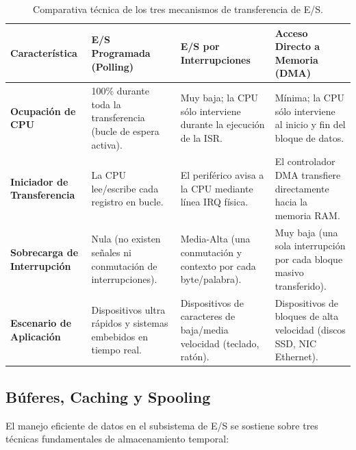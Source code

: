 \documentclass[11pt,letterpaper]{article}
\begin{document}
\begin{table}[htbp]
\centering
\small
\renewcommand{\arraystretch}{1.3}
\begin{tabularx}{\textwidth}{|l|L|L|L|}
\hline
\textbf{Característica} & \textbf{E/S Programada (Polling)} & \textbf{E/S por Interrupciones} & \textbf{Acceso Directo a Memoria (DMA)} \\ \hline
\textbf{Ocupación de CPU} & 100\% durante toda la transferencia (bucle de espera activa). & Muy baja; la CPU sólo interviene durante la ejecución de la ISR. & Mínima; la CPU sólo interviene al inicio y fin del bloque de datos. \\ \hline
\textbf{Iniciador de Transferencia} & La CPU lee/escribe cada registro en bucle. & El periférico avisa a la CPU mediante línea IRQ física. & El controlador DMA transfiere directamente hacia la memoria RAM. \\ \hline
\textbf{Sobrecarga de Interrupción} & Nula (no existen señales ni conmutación de interrupciones). & Media-Alta (una conmutación y contexto por cada byte/palabra). & Muy baja (una sola interrupción por cada bloque masivo transferido). \\ \hline
\textbf{Escenario de Aplicación} & Dispositivos ultra rápidos y sistemas embebidos en tiempo real. & Dispositivos de caracteres de baja/media velocidad (teclado, ratón). & Dispositivos de bloques de alta velocidad (discos SSD, NIC Ethernet). \\ \hline
\end{tabularx}
\caption{Comparativa técnica de los tres mecanismos de transferencia de E/S.}
\label{tab:mecanismos_io}
\end{table}

\subsection{Búferes, Caching y Spooling}

El manejo eficiente de datos en el subsistema de E/S se sostiene sobre tres técnicas fundamentales de almacenamiento temporal:
\end{document}
